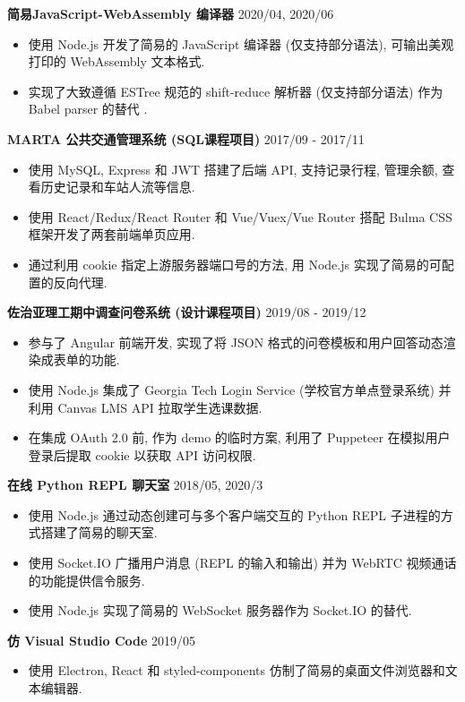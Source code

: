 \documentclass[10.5pt]{article}
\begin{document}
\textbf{简易JavaScript-WebAssembly 编译器} \hfill 2020/04, 2020/06
\begin{itemize}
\item 使用 Node.js 开发了简易的 JavaScript 编译器 (仅支持部分语法), 可输出美观打印的 WebAssembly 文本格式.
\item 实现了大致遵循 ESTree 规范的 shift-reduce 解析器 (仅支持部分语法) 作为 Babel parser 的替代 .
\end{itemize}

\textbf{MARTA 公共交通管理系统 (SQL课程项目) } \hfill 2017/09 - 2017/11
\begin{itemize}
\item 使用 MySQL, Express 和 JWT 搭建了后端 API, 支持记录行程, 管理余额, 查看历史记录和车站人流等信息.
\item 使用 React/Redux/React Router 和 Vue/Vuex/Vue Router 搭配 Bulma CSS 框架开发了两套前端单页应用.
\item 通过利用 cookie 指定上游服务器端口号的方法, 用 Node.js 实现了简易的可配置的反向代理.
\end{itemize}

\textbf{佐治亚理工期中调查问卷系统 (设计课程项目)}  \hfill 2019/08 - 2019/12
\begin{itemize}
\item 参与了 Angular 前端开发, 实现了将 JSON 格式的问卷模板和用户回答动态渲染成表单的功能.
\item 使用 Node.js 集成了 Georgia Tech Login Service (学校官方单点登录系统) 并利用 Canvas LMS API 拉取学生选课数据.
\item 在集成 OAuth 2.0 前, 作为 demo 的临时方案, 利用了 Puppeteer 在模拟用户登录后提取 cookie 以获取 API 访问权限.
\end{itemize}

\textbf{在线 Python REPL 聊天室}  \hfill 2018/05, 2020/3
\begin{itemize}
\item 使用 Node.js 通过动态创建可与多个客户端交互的 Python REPL 子进程的方式搭建了简易的聊天室.
\item 使用 Socket.IO 广播用户消息 (REPL 的输入和输出) 并为 WebRTC 视频通话的功能提供信令服务.
\item 使用 Node.js 实现了简易的 WebSocket 服务器作为 Socket.IO 的替代.
\end{itemize}

\textbf{仿 Visual Studio Code}  \hfill 2019/05
\begin{itemize}
\item 使用 Electron, React 和 styled-components 仿制了简易的桌面文件浏览器和文本编辑器. 
\end{itemize}
\end{document}
